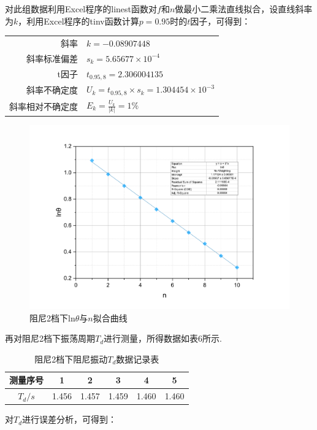 \documentclass[UTF8]{ctexart}
\begin{document}
对此组数据利用Excel程序的linest函数对$f$和$n$做最小二乘法直线拟合，设直线斜率为$k$，利用Excel程序的tinv函数计算$p = 0.95$时的$t$因子，可得到：\par
\begin{center}\begin{tabular}{r l}
{斜率}& {$k=-0.08907448$}\\
{斜率标准偏差}& {$s_k=5.65677\times 10^{-4}$}\\
{t因子}& {$t_{0.95,8}=2.306004135$}\\
{斜率不确定度}& {$U_k=t_{0.95,8}\times s_k = 1.304454\times 10^{-3}$}\\
{斜率相对不确定度}& {$E_k=\frac{U_k}{|k|}=1\%$}
\end{tabular}\end{center}
\begin{figure}\centering
{
\caption{阻尼2档下ln$\theta$与$n$拟合曲线}
\label{2_linear}
\includegraphics[scale=0.4]{2_linear.pdf}
}
\end{figure}
再对阻尼2档下振荡周期$T_{d}$进行测量，所得数据如表6所示. 
\begin{table}[H]
{\begin{center}{
\caption{阻尼2档下阻尼振动$T_d$数据记录表}
\begin{tabular}{|c|c|c|c|c|c|}
\hline
测量序号&1&2&3&4&5\\
\hline
$T_d/s$&1.456&1.457&1.459&1.460&1.460\\
\hline
\end{tabular}}\end{center}}\end{table}
对$T_{d}$进行误差分析，可得到：\par
\end{document}
